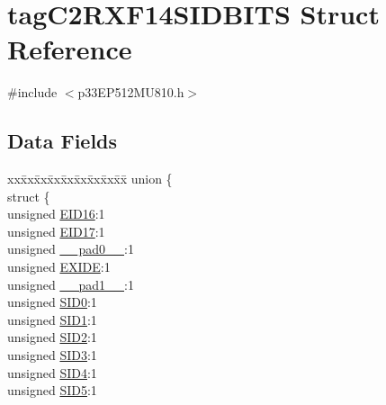 \hypertarget{structtag_c2_r_x_f14_s_i_d_b_i_t_s}{}\section{tag\+C2\+R\+X\+F14\+S\+I\+D\+B\+I\+TS Struct Reference}
\label{structtag_c2_r_x_f14_s_i_d_b_i_t_s}


{\ttfamily \#include $<$p33\+E\+P512\+M\+U810.\+h$>$}

\subsection*{Data Fields}
\begin{DoxyCompactItemize}
\item 
\begin{tabbing}
xx\=xx\=xx\=xx\=xx\=xx\=xx\=xx\=xx\=\kill
union \{\\
\>struct \{\\
\>\>unsigned \hyperlink{structtag_c2_r_x_f14_s_i_d_b_i_t_s_a6dd5663b0c9838c56db040560ca0efa1}{EID16}:1\\
\>\>unsigned \hyperlink{structtag_c2_r_x_f14_s_i_d_b_i_t_s_aa648615464b0eb29967529333eee9fd9}{EID17}:1\\
\>\>unsigned \hyperlink{structtag_c2_r_x_f14_s_i_d_b_i_t_s_adf71f3d8410c1f1dbbc96680a92c49af}{\_\_pad0\_\_}:1\\
\>\>unsigned \hyperlink{structtag_c2_r_x_f14_s_i_d_b_i_t_s_a09ff1c1be3927220bd3dfbc10edfe243}{EXIDE}:1\\
\>\>unsigned \hyperlink{structtag_c2_r_x_f14_s_i_d_b_i_t_s_acaf2d0924a107ec6e8d2e31febaf66f9}{\_\_pad1\_\_}:1\\
\>\>unsigned \hyperlink{structtag_c2_r_x_f14_s_i_d_b_i_t_s_a1ca276ac15df60e1f7b9a6d0011ade93}{SID0}:1\\
\>\>unsigned \hyperlink{structtag_c2_r_x_f14_s_i_d_b_i_t_s_a3405d354f81391f879648f69f504dfc8}{SID1}:1\\
\>\>unsigned \hyperlink{structtag_c2_r_x_f14_s_i_d_b_i_t_s_ad744966dfc49307f731b7045b01b94e5}{SID2}:1\\
\>\>unsigned \hyperlink{structtag_c2_r_x_f14_s_i_d_b_i_t_s_a9345f3e64720be93e83d8dfc827f3f45}{SID3}:1\\
\>\>unsigned \hyperlink{structtag_c2_r_x_f14_s_i_d_b_i_t_s_aefb106fed4bb40e2c3c71ac612c554e3}{SID4}:1\\
\>\>unsigned \hyperlink{structtag_c2_r_x_f14_s_i_d_b_i_t_s_a0f221b3c9612231686bf87ccdcec8489}{SID5}:1\\

\end{tabbing}
\end{DoxyCompactItemize}
